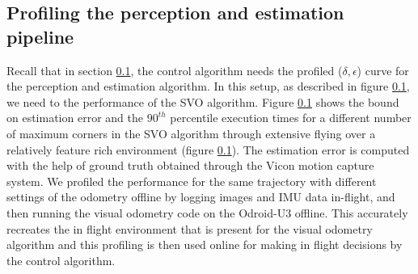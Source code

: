 

\subsection{Profiling the perception and estimation pipeline}

Recall that in section \ref{}, the control algorithm needs the profiled ($\delta,\epsilon$) curve for the perception and estimation algorithm. In this setup, as described in figure \ref{}, we need to the performance of the SVO algorithm. Figure \ref{} shows the bound on estimation error and the $90^{th}$ percentile execution times for a different number of maximum corners in the SVO algorithm through extensive flying over a relatively feature rich environment (figure \ref{}). The estimation error is computed with the help of ground truth obtained through the Vicon motion capture system. We profiled the performance for the same trajectory with different settings of the odometry offline by logging images and IMU data in-flight, and then running the visual odometry code on the Odroid-U3 offline.
This accurately recreates the in flight environment that is present for the visual odometry algorithm and this profiling is then used online for making in flight decisions by the control algorithm.

